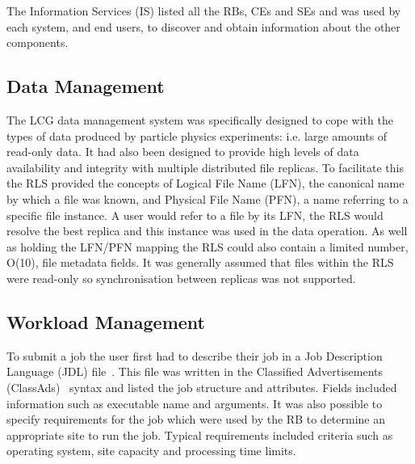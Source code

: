 The Information Services (IS) listed all the RBs, CEs and SEs and was used by each system, and end users,  to discover and obtain information about the other components.


\subsection{Data Management}
The LCG data management system was specifically designed to cope with the types of data produced by particle physics experiments: i.e. large amounts of read-only data. It had also been designed to provide high levels of data availability and integrity with multiple distributed file replicas. To facilitate this the RLS provided the concepts of Logical File Name (LFN), the canonical name by which a file was known, and Physical File Name (PFN), a name referring to a specific file instance. A user would refer to a file by its LFN, the RLS would resolve the best replica and this instance was used in the data operation. As well as holding the LFN/PFN mapping the RLS could also contain a limited number, O(10), file metadata fields. It was generally assumed that files within the RLS were read-only so synchronisation between replicas was not supported.


\subsection{Workload Management}
To submit a job the user first had to describe their job in a Job Description Language (JDL) file~\cite{citeulike:835506}.  This file was written in the Classified Advertisements (ClassAds)~\cite{citeulike:835507} syntax and listed the job structure and attributes. Fields included information such as executable name and arguments. It was also possible to specify requirements for the job which were used by the RB to determine an appropriate site to run the job. Typical requirements included criteria such as operating system, site capacity and processing time limits. 

